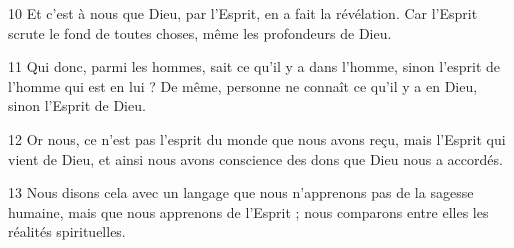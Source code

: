 
10 Et c’est à nous que Dieu, par l’Esprit, en a fait la révélation. Car l’Esprit scrute le fond de toutes choses, même les profondeurs de Dieu.

11 Qui donc, parmi les hommes, sait ce qu’il y a dans l’homme, sinon l’esprit de l’homme qui est en lui ? De même, personne ne connaît ce qu’il y a en Dieu, sinon l’Esprit de Dieu.

12 Or nous, ce n’est pas l’esprit du monde que nous avons reçu, mais l’Esprit qui vient de Dieu, et ainsi nous avons conscience des dons que Dieu nous a accordés.

13 Nous disons cela avec un langage que nous n’apprenons pas de la sagesse humaine, mais que nous apprenons de l’Esprit ; nous comparons entre elles les réalités spirituelles.